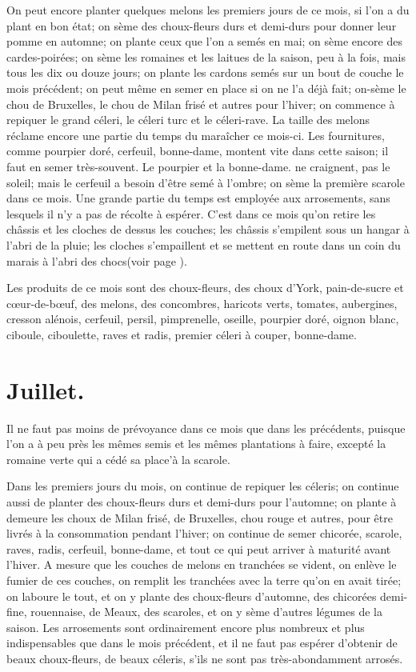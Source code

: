 \documentclass[10pt,a4paper]{book}
\begin{document}
On peut encore planter quelques melons les premiers jours de ce mois, si l'on a du plant en bon état; on sème des choux-fleurs durs et demi-durs pour donner leur pomme en automne; on plante ceux que l'on a semés en mai; on sème encore des cardes-poirées; on sème les romaines et les laitues de la saison, peu à la fois, mais tous les dix ou douze jours; on plante les cardons semés sur un bout de couche le mois précédent; on peut même en semer en place si on ne l'a déjà fait; on-sème le chou de Bruxelles, le chou de Milan frisé et autres pour l'hiver; on commence à repiquer le grand céleri, le céleri turc et le céleri-rave. La taille des melons réclame encore une partie du temps du maraîcher ce mois-ci. Les fournitures, comme pourpier doré, cerfeuil, bonne-dame, montent vite dans cette saison; il faut en semer très-souvent. Le pourpier et la bonne-dame. ne craignent, pas le soleil; mais le cerfeuil a besoin d'être semé à l'ombre; on sème la première scarole dans ce mois. Une grande partie du temps est employée aux arrosements, sans lesquels il n'y a pas de récolte à espérer. C'est dans ce mois qu'on retire les châssis et les cloches de dessus les couches; les châssis s'empilent sous un hangar à l’abri de la pluie; les cloches s'empaillent et se mettent en route dans un coin du marais à l'abri des chocs(voir page \pageref{route}).

Les produits de ce mois sont des choux-fleurs, des choux d'York, pain-de-sucre et cœur-de-bœuf, des melons, des concombres, haricots verts, tomates, aubergines, cresson alénois, cerfeuil, persil, pimprenelle, oseille, pourpier doré, oignon blanc, ciboule, ciboulette, raves et radis, premier céleri à couper, bonne-dame.

\section{Juillet.}

Il ne faut pas moins de prévoyance dans ce mois que dans les précédents, puisque l'on a à peu près les mêmes semis et les mêmes plantations à faire, excepté la romaine verte qui a cédé sa place'à la scarole.

Dans les premiers jours du mois, on continue de repiquer les céleris; on continue aussi de planter des choux-fleurs durs et demi-durs pour l'automne; on plante à demeure les choux de Milan frisé, de Bruxelles, chou rouge et autres, pour être livrés à la consommation pendant l'hiver; on continue de semer chicorée, scarole, raves, radis, cerfeuil, bonne-dame, et tout ce qui peut arriver à maturité avant l'hiver. A mesure que les couches de melons en tranchées se vident, on enlève le fumier de ces couches, on remplit les tranchées avec la terre qu'on en avait tirée; on laboure le tout, et on y plante des choux-fleurs d'automne, des chicorées demi-fine, rouennaise, de Meaux, des scaroles, et on y sème d'autres légumes de la saison. Les arrosements sont ordinairement encore plus nombreux et plus indispensables que dans le mois précédent, et il ne faut pas espérer d'obtenir de beaux choux-fleurs, de beaux céleris, s'ils ne sont pas très-abondamment arrosés.
\end{document}
